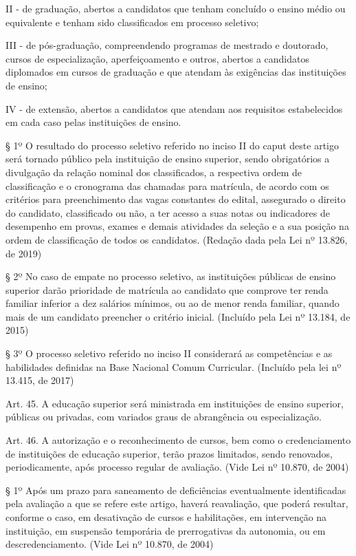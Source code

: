\documentclass[
]{book}
\begin{document}
II - de graduação, abertos a candidatos que tenham concluído o ensino médio ou equivalente e tenham sido classificados em processo seletivo;

III - de pós-graduação, compreendendo programas de mestrado e doutorado, cursos de especialização, aperfeiçoamento e outros, abertos a candidatos diplomados em cursos de graduação e que atendam às exigências das instituições de ensino;

IV - de extensão, abertos a candidatos que atendam aos requisitos estabelecidos em cada caso pelas instituições de ensino.

§ 1º O resultado do processo seletivo referido no inciso II do caput deste artigo será tornado público pela instituição de ensino superior, sendo obrigatórios a divulgação da relação nominal dos classificados, a respectiva ordem de classificação e o cronograma das chamadas para matrícula, de acordo com os critérios para preenchimento das vagas constantes do edital, assegurado o direito do candidato, classificado ou não, a ter acesso a suas notas ou indicadores de desempenho em provas, exames e demais atividades da seleção e a sua posição na ordem de classificação de todos os candidatos. (Redação dada pela Lei nº 13.826, de 2019)

§ 2º No caso de empate no processo seletivo, as instituições públicas de ensino superior darão prioridade de matrícula ao candidato que comprove ter renda familiar inferior a dez salários mínimos, ou ao de menor renda familiar, quando mais de um candidato preencher o critério inicial. (Incluído pela Lei nº 13.184, de 2015)

§ 3º O processo seletivo referido no inciso II considerará as competências e as habilidades definidas na Base Nacional Comum Curricular. (Incluído pela lei nº 13.415, de 2017)

Art. 45. A educação superior será ministrada em instituições de ensino superior, públicas ou privadas, com variados graus de abrangência ou especialização.

Art. 46. A autorização e o reconhecimento de cursos, bem como o credenciamento de instituições de educação superior, terão prazos limitados, sendo renovados, periodicamente, após processo regular de avaliação. (Vide Lei nº 10.870, de 2004)

§ 1º Após um prazo para saneamento de deficiências eventualmente identificadas pela avaliação a que se refere este artigo, haverá reavaliação, que poderá resultar, conforme o caso, em desativação de cursos e habilitações, em intervenção na instituição, em suspensão temporária de prerrogativas da autonomia, ou em descredenciamento. (Vide Lei nº 10.870, de 2004)
\end{document}
